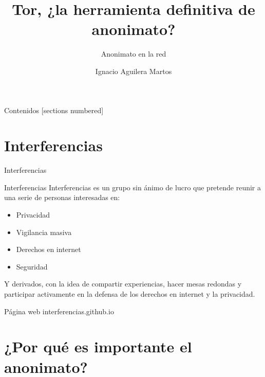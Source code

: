 \documentclass[10pt]{beamer}
\title{Tor, ¿la herramienta definitiva de anonimato?}
\subtitle{Anonimato en la red}
\date{}
\author{Ignacio Aguilera Martos}
\begin{document}
	

	
	
\frame{\titlepage}

	
\begin{frame}{Contenidos}
	[sections numbered]
	\tableofcontents[hideallsubsections]
\end{frame}

\section{Interferencias}

\begin{frame}{Interferencias}
	\pause
	\begin{block}{Interferencias}
		Interferencias es un grupo sin ánimo de lucro que pretende reunir a una serie de personas interesadas en:
		
		\begin{itemize}
			\item Privacidad
			\item Vigilancia masiva
			\item Derechos en internet
			\item Seguridad
		\end{itemize}
		
		Y derivados, con la idea de compartir experiencias, hacer mesas redondas y participar activamente en la defensa de los derechos en internet y la privacidad.
	\end{block}
	\pause
	\begin{alertblock}{Página web}
		interferencias.github.io
	\end{alertblock}
\end{frame}

\section{¿Por qué es importante el anonimato?}
\end{document}
